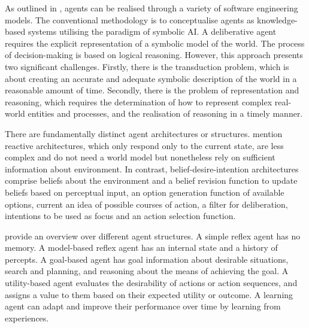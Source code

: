 \documentclass{article}
\begin{document}
As outlined in \cite{wooldridge_intelligent_1995}, agents can be realised through a variety of software engineering models. The conventional methodology is to conceptualise agents as knowledge-based systems utilising the paradigm of symbolic AI. A deliberative agent requires the explicit representation of a symbolic model of the world. The process of decision-making is based on logical reasoning. However, this approach presents two significant challenges. Firstly, there is the transduction problem, which is about creating an accurate and adequate symbolic description of the world in a reasonable amount of time. Secondly, there is the problem of representation and reasoning, which requires the determination of how to represent complex real-world entities and processes, and the realisation of reasoning in a timely manner.

There are fundamentally distinct agent architectures or structures. \cite{goos_intelligent_2002} mention reactive architectures, which only respond only to the current state, are less complex and do not need a world model but nonetheless rely on sufficient information about environment. In contrast, belief-desire-intention architectures comprise beliefs about the environment and a belief revision function to update beliefs based on perceptual input, an option generation function of available options, current an idea of possible courses of action, a filter for deliberation, intentions to be used as focus and an action selection function.

\cite{russell_artificial_2010} provide an overview over different agent structures. A simple reflex agent has no memory. A model-based reflex agent has an internal state and a history of percepts. A goal-based agent has goal information about desirable situations, search and planning, and reasoning about the means of achieving the goal. A utility-based agent evaluates the desirability of actions or action sequences, and assigns a value to them based on their expected utility or outcome. A learning agent can adapt and improve their performance over time by learning from experiences.

\end{document}
